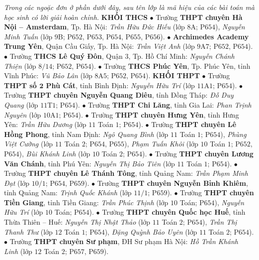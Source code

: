\begin{multicols}{2}
	\textit{Trong các ngoặc đơn ở phần dưới đây, sau tên lớp là mã hiệu của các bài toán mà học sinh có lời giải hoàn chỉnh.}
	\vskip 0.1cm
	\textbf{\color{thachthuctoanhoc}KHỐI THCS}
	\vskip 0.1cm
	$\bullet$ Trường \textbf{\color{thachthuctoanhoc}THPT chuyên Hà Nội -- Amsterdam}, Tp. Hà Nội: \textit{Trần Hữu Đức Hiếu} (lớp $8$A; P$654$), \textit{Nguyễn Minh Tuấn} (lớp $9$B; P$652$, P$653$, P$654$, P$655$, P$656$).
	\vskip 0.1cm
	$\bullet$ \textbf{\color{thachthuctoanhoc}Archimedes Academy Trung Yên}, Quận Cầu Giấy, Tp. Hà Nội: \textit{Trần Việt Anh} (lớp $9$A$7$; P$652$, P$654$).
	\vskip 0.1cm
	$\bullet$ Trường \textbf{\color{thachthuctoanhoc}THCS Lê Quý Đôn}, Quận $3$, Tp. Hồ Chí Minh: \textit{Nguyễn Chánh Thiện} (lớp $8/14$; P$652$, P$654$).
	\vskip 0.1cm
	$\bullet$ Trường \textbf{\color{thachthuctoanhoc}THCS Phúc Yên}, Tp. Phúc Yên, tỉnh Vĩnh Phúc: \textit{Vũ Bảo Lân} (lớp $8$A$5$; P$652$, P$654$).
	\vskip 0.1cm
	\textbf{\color{thachthuctoanhoc}KHỐI THPT}
	\vskip 0.1cm
	$\bullet$ Trường \textbf{\color{thachthuctoanhoc}THPT số $\pmb{2}$ Phù Cát}, tỉnh Bình Định: \textit{Nguyễn Hữu Trí} (lớp $11$A$1$; P$654$).
	\vskip 0.1cm
	$\bullet$ Trường \textbf{\color{thachthuctoanhoc}THPT chuyên Nguyễn Quang Diêu}, tỉnh Đồng Tháp: \textit{Đỗ Duy Quang} (lớp $11$T$1$; P$654$).
	\vskip 0.1cm
	$\bullet$ Trường \textbf{\color{thachthuctoanhoc}THPT Chi Lăng}, tỉnh Gia Lai: \textit{Phan Trịnh Nguyên} (lớp $10$A$1$; P$654$).
	\vskip 0.1cm
	$\bullet$ Trường \textbf{\color{thachthuctoanhoc}THPT chuyên Hưng Yên}, tỉnh Hưng Yên: \textit{Trần Hữu Dương} (lớp $11$ Toán $1$; P$654$).
	\vskip 0.1cm
	$\bullet$ Trường \textbf{\color{thachthuctoanhoc}THPT chuyên Lê Hồng Phong}, tỉnh Nam Định: \textit{Ngô Quang Bình} (lớp $11$ Toán $1$; P$654$), \textit{Phùng Việt Cường} (lớp $11$ Toán $2$; P$654$, P$655$), \textit{Phạm Tuấn Khôi} (lớp $10$ Toán $1$; P$652$, P$654$), \textit{Bùi Khánh Linh} (lớp $10$ Toán $2$; P$654$).
	\vskip 0.1cm
	$\bullet$ Trường \textbf{\color{thachthuctoanhoc}THPT chuyên Lương Văn Chánh}, tỉnh Phú Yên: \textit{Nguyễn Thị Bảo Tiên} (lớp $11$ Toán $1$; P$654$).
	\vskip 0.1cm
	$\bullet$ Trường \textbf{\color{thachthuctoanhoc}THPT chuyên Lê Thánh Tông}, tỉnh Quảng Nam: \textit{Trần Phạm Minh Đạt} (lớp $10/1$; P$654$, P$659$).
	\vskip 0.1cm
	$\bullet$ Trường \textbf{\color{thachthuctoanhoc}THPT chuyên Nguyễn Bỉnh Khiêm}, tỉnh Quảng Nam: \textit{Trịnh Quốc Khánh} (lớp $11/1$; P$659$).
	\vskip 0.1cm
	$\bullet$ Trường \textbf{\color{thachthuctoanhoc}THPT chuyên Tiền Giang}, tỉnh Tiền Giang: \textit{Trần Phúc Thịnh} (lớp $10$ Toán; P$654$), \textit{Nguyễn Hữu Trí} (lớp $10$ Toán; P$654$).
	\vskip 0.1cm
	$\bullet$ Trường \textbf{\color{thachthuctoanhoc}THPT chuyên Quốc học Huế}, tỉnh Thừa Thiên -- Huế: \textit{Nguyễn Thị Nhật Thảo} (lớp $11$ Toán $2$; P$654$), \textit{Trần Thị Thanh Thư} (lớp $12$ Toán $1$; P$654$), \textit{Đặng Quỳnh Bảo Uyên} (lớp $11$ Toán $2$; P$654$).
	\vskip 0.1cm
	$\bullet$ Trường \textbf{\color{thachthuctoanhoc}THPT chuyên Sư phạm}, ĐH Sư phạm Hà Nội: \textit{Hồ Trần Khánh Linh} (lớp $12$ Toán $2$; P$657$, P$659$).
\end{multicols}
